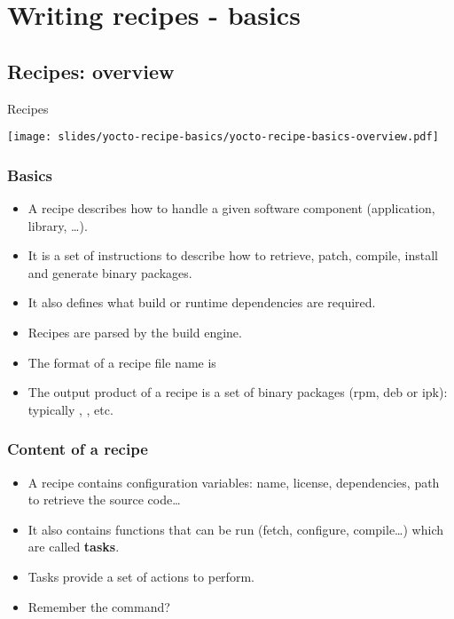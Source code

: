 \section{Writing recipes - basics}

\subsection{Recipes: overview}

\begin{frame}{Recipes}
  \begin{center}
    \texttt{[image: slides/yocto-recipe-basics/yocto-recipe-basics-overview.pdf]}
  \end{center}
\end{frame}

\begin{frame}
  \frametitle{Basics}
  \begin{itemize}
    \item A recipe describes how to handle a given software component
      (application, library, \dots).
    \item It is a set of instructions to describe how to retrieve, patch,
      compile, install and generate binary packages.
    \item It also defines what build or runtime dependencies are
      required.
    \item Recipes are parsed by the  build engine.
    \item The format of a recipe file name is
    \item The output product of a recipe is a set of binary packages (rpm,
      deb or ipk): typically , ,
       etc.
  \end{itemize}
\end{frame}

\begin{frame}
  \frametitle{Content of a recipe}
  \begin{itemize}
    \item A recipe contains configuration variables: name, license,
      dependencies, path to retrieve the source code\dots
    \item It also contains functions that can be run (fetch,
      configure, compile\dots) which are called {\bf tasks}.
    \item Tasks provide a set of actions to perform.
    \item Remember the  command?
  \end{itemize}
\end{frame}


